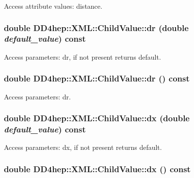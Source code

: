 Access attribute values: distance. \hypertarget{struct_d_d4hep_1_1_x_m_l_1_1_child_value_aee247a351467464656a068ad5872920d}{
\subsubsection[{dr}]{\setlength{\rightskip}{0pt plus 5cm}double DD4hep::XML::ChildValue::dr (double {\em default\_\-value}) const}}
\label{struct_d_d4hep_1_1_x_m_l_1_1_child_value_aee247a351467464656a068ad5872920d}


Access parameters: dr, if not present returns default. \hypertarget{struct_d_d4hep_1_1_x_m_l_1_1_child_value_ac963bcbd1827f29bf2fb5c975fced5f3}{
\subsubsection[{dr}]{\setlength{\rightskip}{0pt plus 5cm}double DD4hep::XML::ChildValue::dr () const}}
\label{struct_d_d4hep_1_1_x_m_l_1_1_child_value_ac963bcbd1827f29bf2fb5c975fced5f3}


Access parameters: dr. \hypertarget{struct_d_d4hep_1_1_x_m_l_1_1_child_value_aa178250bd933dbca509291b59325c690}{
\subsubsection[{dx}]{\setlength{\rightskip}{0pt plus 5cm}double DD4hep::XML::ChildValue::dx (double {\em default\_\-value}) const}}
\label{struct_d_d4hep_1_1_x_m_l_1_1_child_value_aa178250bd933dbca509291b59325c690}


Access parameters: dx, if not present returns default. \hypertarget{struct_d_d4hep_1_1_x_m_l_1_1_child_value_a8f9adc2c67d7a6302de9521ee96b0025}{
\subsubsection[{dx}]{\setlength{\rightskip}{0pt plus 5cm}double DD4hep::XML::ChildValue::dx () const}}
\label{struct_d_d4hep_1_1_x_m_l_1_1_child_value_a8f9adc2c67d7a6302de9521ee96b0025}


